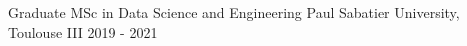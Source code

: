 


\begin{cventries}


\cventry
{Graduate} %
{MSc in Data Science and Engineering} %
{Paul Sabatier University, Toulouse III} %
{2019 - 2021} %
{}


\end{cventries}
